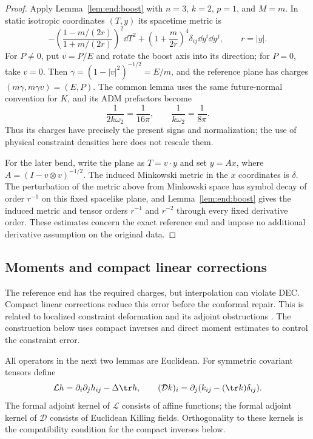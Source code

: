 \begin{proof}
Apply Lemma~\ref{lem:end:boost} with $n=3$, $k=2$, $p=1$, and
$M=m$. In static isotropic coordinates $(T,y)$ its spacetime metric is
\begin{equation}
 \label{n3:reduction:schwarzschild-spacetime}
 -\left(\frac{1-m/(2r)}{1+m/(2r)}\right)^2\dd T^2
       +\left(1+\frac{m}{2r}\right)^4\delta_{ij}\dd y^i\dd y^j,
 \qquad r=|y|.
\end{equation}
For $P\ne0$, put $v=P/E$ and rotate the boost axis into its direction;
for $P=0$, take $v=0$. Then
$\gamma=(1-|v|^2)^{-1/2}=E/m$, and the reference plane has charges
$(m\gamma,m\gamma v)=(E,P)$. The common lemma uses the same
future-normal convention for $K$, and its ADM prefactors become
\[
 \frac1{2k\omega_2}=\frac1{16\pi},\qquad
 \frac1{k\omega_2}=\frac1{8\pi}.
\]
Thus its charges have precisely the present signs and normalization;
the use of physical constraint densities here does not rescale them.

For the later bend, write the plane as $T=v\cdot y$ and set
$y=Ax$, where $A=(I-v\otimes v)^{-1/2}$. The induced Minkowski
metric in the $x$ coordinates is $\delta$. The perturbation of the
metric above from Minkowski space has symbol decay of order $r^{-1}$
on this fixed spacelike plane, and
Lemma~\ref{lem:end:boost} gives the induced metric and tensor orders
$r^{-1}$ and $r^{-2}$ through every fixed derivative order. These
estimates concern the exact reference end and impose no additional
derivative assumption on the original data.
\end{proof}

\subsection{Moments and compact linear corrections}

The reference end has the required charges, but interpolation can
violate DEC. Compact linear corrections reduce this error before the
conformal repair. This is related to localized constraint deformation
and its adjoint obstructions
\cite{CorvinoSchoen2006,ChruscielDelay2003}. The construction below uses
compact inverses and direct moment estimates to control the constraint error.

All operators in the next two lemmas are Euclidean.  For symmetric
covariant tensors define
\begin{equation}
 \label{n3:reduction:linear-operators}
 \mathcal Lh=\partial_i\partial_jh_{ij}-\Delta\tr h,
 \qquad
 (\mathcal Dk)_i=\partial_j(k_{ij}-(\tr k)\delta_{ij}).
\end{equation}
The formal adjoint kernel of $\mathcal L$ consists of affine functions;
the formal adjoint kernel of $\mathcal D$ consists of Euclidean Killing
fields.  Orthogonality to these kernels is the compatibility condition
for the compact inverses below.

